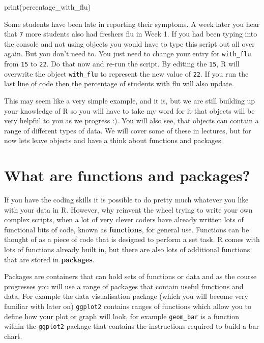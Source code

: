 \documentclass[
]{book}
\newenvironment{Shaded}{\begin{snugshade}}{\end{snugshade}}
\newcommand{\FunctionTok}[1]{\textcolor[rgb]{0.00,0.00,0.00}{#1}}
\newcommand{\NormalTok}[1]{#1}
\begin{document}
\begin{Shaded}
\begin{Highlighting}[]
\FunctionTok{print}\NormalTok{(percentage\_with\_flu)}
\end{Highlighting}
\end{Shaded}

Some students have been late in reporting their symptoms. A week later you hear that \texttt{7} more students also had freshers flu in Week 1. If you had been typing into the console and not using objects you would have to type this script out all over again. But you don't need to. You just need to change your entry for \texttt{with\_flu} from \texttt{15} to \texttt{22}. Do that now and re-run the script. By editing the \texttt{15}, R will overwrite the object \texttt{with\_flu} to represent the new value of \texttt{22}. If you run the last line of code then the percentage of students with flu will also update.

This may seem like a very simple example, and it is, but we are still building up your knowledge of R so you will have to take my word for it that objects will be very helpful to you as we progress :). You will also see, that objects can contain a range of different types of data. We will cover some of these in lectures, but for now lets leave objects and have a think about functions and packages.

\hypertarget{what-are-functions-and-packages}{%
\section{What are functions and packages?}\label{what-are-functions-and-packages}}

If you have the coding skills it is possible to do pretty much whatever you like with your data in R. However, why reinvent the wheel trying to write your own complex scripts, when a lot of very clever coders have already written lots of functional bits of code, known as \textbf{functions}, for general use. Functions can be thought of as a piece of code that is designed to perform a set task. R comes with lots of functions already built in, but there are also lots of additional functions that are stored in \textbf{packages}.

Packages are containers that can hold sets of functions or data and as the course progresses you will use a range of packages that contain useful functions and data. For example the data visualisation package (which you will become very familiar with later on) \texttt{ggplot2} contains ranges of functions which allow you to define how your plot or graph will look, for example \texttt{geom\_bar} is a function within the \texttt{ggplot2} package that contains the instructions required to build a bar chart.
\end{document}
